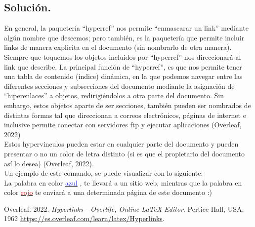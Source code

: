 \documentclass[letterpaper,12pt]{article}
\begin{document}
    \subsection*{Solución.}
    En general, la paquetería ``hyperref'' nos permite ``enmascarar un link'' mediante algún nombre que deseemos; pero también, es la paquetería que permite incluir links de manera explicita en el documento (sin nombrarlo de otra manera). Siempre que toquemos los objetos incluidos por ``hyperref'' nos direccionará al link que describe.
    La principal función de ``hyperref'', es que nos permite tener una tabla de contenido (índice) dinámica, en la que podemos navegar entre las diferentes secciones y subsecciones del documento mediante la asignación de ``hiperenlaces'' a objetos, redirigiéndolos a otra parte del documento. Sin embargo, estos objetos aparte de ser secciones, también pueden ser nombrados de distintas formas tal que direccionan a correos electrónicos, páginas de internet e inclusive permite conectar con servidores ftp y ejecutar aplicaciones (Overleaf, 2022)\\
    Estos hypervinculos pueden estar en cualquier parte del documento y pueden presentar o no un color de letra distinto (si es que el propietario del documento así lo desea) (Overleaf, 2022).\\

    Un ejemplo de este comando, se puede visualizar con lo siguiente:\\
    La palabra en color \href{https://www.youtube.com/watch?v=o_1aF54DO60}{\textcolor{blue}{azul}} , te llevará a un sitio web, mientras que la palabra en color \hyperlink{uwu}{\textcolor{red}{rojo}}  te enviará a una determinada página de este documento :)
    
\begin{thebibliography}{}
\bibitem{} Overleaf. 2022. \textit{Hyperlinks - Overlife, Online LaTeX Editor}. Pertice Hall, USA, 1962 \url{https://es.overleaf.com/learn/latex/Hyperlinks}.
\end{thebibliography}


   
\end{document}
